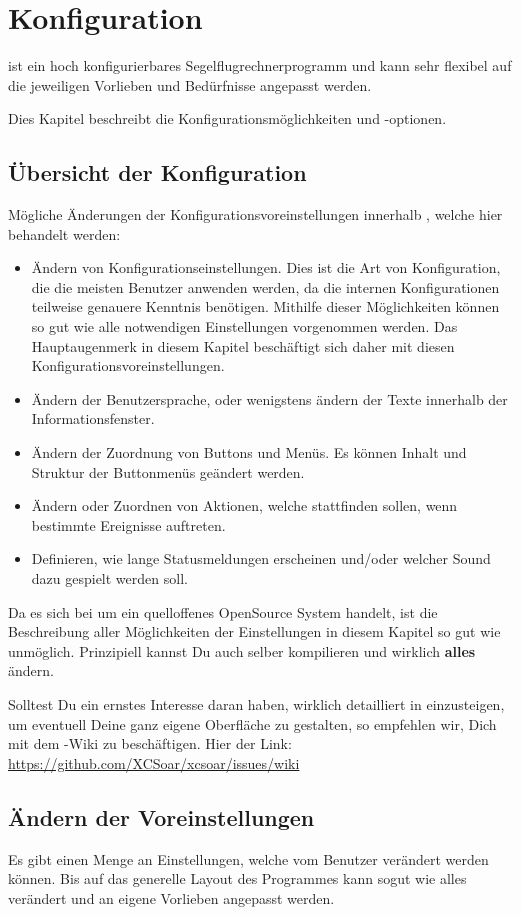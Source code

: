 \chapter{Konfiguration}\label{cha:configuration}
\xc ist ein hoch konfigurierbares Segelflugrechnerprogramm und kann sehr flexibel auf die jeweiligen Vorlieben
und Bedürfnisse angepasst werden.

Dies Kapitel beschreibt die Konfigurationsmöglichkeiten und  -optionen.
\section{Übersicht der Konfiguration}
Mögliche  Änderungen der Konfigurationsvoreinstellungen innerhalb \xc, welche hier behandelt werden:
\begin{itemize}
\item Ändern von  Konfigurationseinstellungen. Dies ist die Art von Konfiguration, die die meisten
    Benutzer anwenden werden, da die internen Konfigurationen teilweise genauere Kenntnis benötigen.
    Mithilfe dieser Möglichkeiten können so gut wie alle notwendigen  Einstellungen vorgenommen werden.
    Das Hauptaugenmerk in diesem Kapitel beschäftigt sich daher mit diesen Konfigurationsvoreinstellungen.
 \item Ändern der Benutzersprache, oder wenigstens ändern der Texte innerhalb der
     Informationsfenster.
\item Ändern der Zuordnung von Buttons und Menüs. Es können Inhalt und Struktur der Buttonmenüs
    geändert werden.
\item Ändern oder Zuordnen von Aktionen, welche stattfinden sollen, wenn bestimmte Ereignisse
    auftreten.
\item Definieren, wie lange Statusmeldungen erscheinen und/oder welcher Sound dazu gespielt werden
    soll.
\end{itemize}
Da es sich bei \xc  um ein quelloffenes OpenSource System handelt, ist die Beschreibung aller
Möglichkeiten der Einstellungen in diesem Kapitel so gut wie unmöglich. Prinzipiell kannst Du \xc auch
selber kompilieren und wirklich \textbf{alles} ändern.

Solltest Du ein ernstes Interesse daran haben, wirklich detailliert in \xc  einzusteigen, um eventuell Deine
ganz eigene Oberfläche zu gestalten, so empfehlen wir,  Dich mit dem \xc-Wiki  zu beschäftigen. Hier der
Link: \url{https://github.com/XCSoar/xcsoar/issues/wiki}


\section{Ändern der Voreinstellungen}
Es gibt einen Menge an Einstellungen, welche vom Benutzer verändert werden
können. Bis auf das generelle Layout des Programmes kann
 sogut wie alles verändert und
an eigene Vorlieben angepasst werden.

